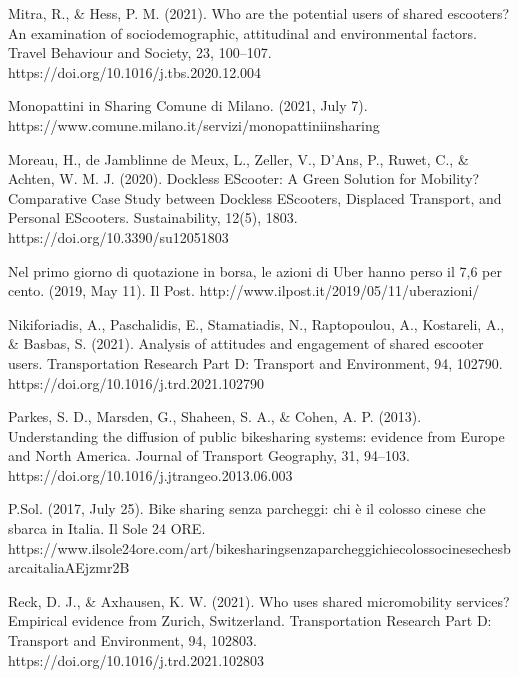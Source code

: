 \documentclass[letterpaper,10pt,english]{jupyterBook}
\begin{document}
\sphinxAtStartPar
Mitra, R., \& Hess, P. M. (2021). Who are the potential users of shared e\sphinxhyphen{}scooters? An examination of socio\sphinxhyphen{}demographic, attitudinal and environmental factors. Travel Behaviour and Society, 23, 100–107. https://doi.org/10.1016/j.tbs.2020.12.004

\sphinxAtStartPar
Monopattini in Sharing \sphinxhyphen{} Comune di Milano. (2021, July 7). https://www.comune.milano.it/servizi/monopattini\sphinxhyphen{}in\sphinxhyphen{}sharing

\sphinxAtStartPar
Moreau, H., de Jamblinne de Meux, L., Zeller, V., D’Ans, P., Ruwet, C., \& Achten, W. M. J. (2020). Dockless E\sphinxhyphen{}Scooter: A Green Solution for Mobility? Comparative Case Study between Dockless E\sphinxhyphen{}Scooters, Displaced Transport, and Personal E\sphinxhyphen{}Scooters. Sustainability, 12(5), 1803. https://doi.org/10.3390/su12051803

\sphinxAtStartPar
Nel primo giorno di quotazione in borsa, le azioni di Uber hanno perso il 7,6 per cento. (2019, May 11). Il Post. http://www.ilpost.it/2019/05/11/uber\sphinxhyphen{}azioni/

\sphinxAtStartPar
Nikiforiadis, A., Paschalidis, E., Stamatiadis, N., Raptopoulou, A., Kostareli, A., \& Basbas, S. (2021). Analysis of attitudes and engagement of shared e\sphinxhyphen{}scooter users. Transportation Research Part D: Transport and Environment, 94, 102790. https://doi.org/10.1016/j.trd.2021.102790

\sphinxAtStartPar
Parkes, S. D., Marsden, G., Shaheen, S. A., \& Cohen, A. P. (2013). Understanding the diffusion of public bikesharing systems: evidence from Europe and North America. Journal of Transport Geography, 31, 94–103. https://doi.org/10.1016/j.jtrangeo.2013.06.003

\sphinxAtStartPar
P.Sol. (2017, July 25). Bike sharing senza parcheggi: chi è il colosso cinese che sbarca in Italia. Il Sole 24 ORE. https://www.ilsole24ore.com/art/bike\sphinxhyphen{}sharing\sphinxhyphen{}senza\sphinxhyphen{}parcheggi\sphinxhyphen{}chi\sphinxhyphen{}e\sphinxhyphen{}colosso\sphinxhyphen{}cinese\sphinxhyphen{}che\sphinxhyphen{}sbarca\sphinxhyphen{}italia\sphinxhyphen{}AEjzmr2B

\sphinxAtStartPar
Reck, D. J., \& Axhausen, K. W. (2021). Who uses shared micro\sphinxhyphen{}mobility services? Empirical evidence from Zurich, Switzerland. Transportation Research Part D: Transport and Environment, 94, 102803. https://doi.org/10.1016/j.trd.2021.102803
\end{document}
